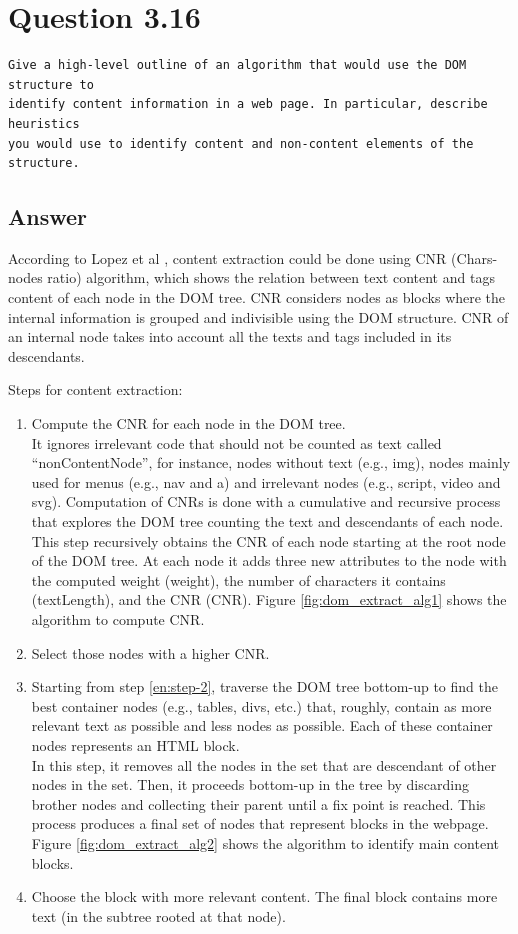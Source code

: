 \documentclass[letterpaper,11pt]{article}
\begin{document}
\noindent\makebox[\linewidth]{\rule{\textwidth}{0.4pt}}


\section*{Question 3.16}
\begin{verbatim}
Give a high-level outline of an algorithm that would use the DOM structure to
identify content information in a web page. In particular, describe heuristics
you would use to identify content and non-content elements of the structure.
\end{verbatim}

\subsection*{Answer}

According to Lopez et al \cite{lopez2012using}, content extraction could be done using CNR (Chars-nodes ratio) algorithm, which shows the relation between text content and tags content of each node in the DOM tree. CNR considers nodes as blocks where the internal information is grouped and indivisible using the DOM structure. CNR of an internal node takes into account all the texts and tags included in its descendants. 

Steps for content extraction:
\begin{enumerate}
	\item Compute the CNR for each node in the DOM tree.\\
	 It ignores irrelevant code that should not be counted as text called “nonContentNode”, for instance, nodes without text (e.g., img), nodes mainly used for menus (e.g., nav and a) and irrelevant nodes (e.g., script, video and svg). Computation of CNRs is done with a cumulative and recursive process that explores the DOM tree counting the text and descendants of each node. This step recursively obtains the CNR of each node starting at the root node of the DOM tree. At each node it adds three new attributes to the node with the computed weight (weight), the number of characters it contains (textLength), and the CNR (CNR). Figure \ref{fig:dom_extract_alg1} shows the algorithm to compute CNR. 
	\item \label{en:step-2} Select those nodes with a higher CNR.
	\item Starting from step \ref{en:step-2}, traverse the DOM tree bottom-up to find the best container nodes (e.g., tables, divs, etc.) that, roughly, contain as more relevant text as possible and less nodes as possible. Each of these container nodes represents an HTML block.\\
	In this step, it removes all the nodes in the set that are descendant of other nodes in the set. Then, it proceeds bottom-up in the tree by discarding brother nodes and collecting their parent until a fix point is reached. This process produces a final set of nodes that represent blocks in the webpage. Figure \ref{fig:dom_extract_alg2} shows the algorithm to identify main content blocks. 
	\item Choose the block with more relevant content. The final block contains more text (in the subtree rooted at that node).
\end{enumerate}
\end{document}
